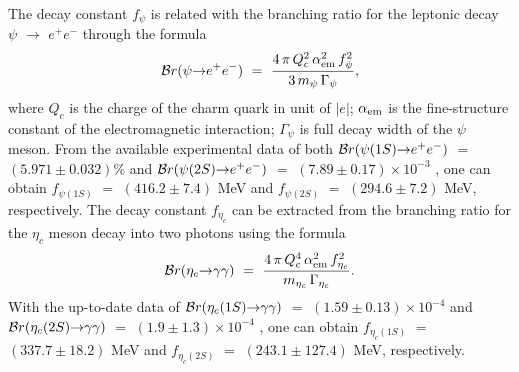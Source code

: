 \documentclass[preprint,superscriptaddress,nofootinbib]{revtex4}
\begin{document}
  The decay constant $f_{\psi}$ is related with the branching ratio
  for the leptonic decay ${\psi}$ ${\to}$ $e^{+}e^{-}$ through
  the formula \cite{prd74.034001}
   \begin{equation}
  {\cal B}r({\psi}{\to}e^{+}e^{-})\ =\
   \frac{ 4\,{\pi}\,Q_{c}^{2}\,{\alpha}_{\rm em}^{2}\,f_{\psi}^{2} }
        { 3\,m_{\psi}\,{\Gamma}_{\psi} }
   \label{fpsi},
   \end{equation}
  where $Q_{c}$ is the charge of the charm quark in unit of
  ${\vert}e{\vert}$; ${\alpha}_{\rm em}$ is the fine-structure
  constant of the electromagnetic interaction; ${\Gamma}_{\psi}$
  is full decay width of the ${\psi}$ meson.
  From the available experimental data of both
  ${\cal B}r({\psi}(1S){\to}e^{+}e^{-})$ $=$ $(5.971{\pm}0.032)\%$ and
  ${\cal B}r({\psi}(2S){\to}e^{+}e^{-})$ $=$ $(7.89{\pm}0.17){\times}10^{-3}$
  \cite{pdg}, one can obtain $f_{{\psi}(1S)}$ $=$ $(416.2{\pm}7.4)$
  MeV and $f_{{\psi}(2S)}$ $=$ $(294.6{\pm}7.2)$ MeV, respectively.
  The decay constant $f_{{\eta}_{c}}$ can be extracted from
  the branching ratio for the ${\eta}_{c}$ meson decay into two
  photons using the formula \cite{prd74.034001}
   \begin{equation}
  {\cal B}r({\eta}_{c}{\to}{\gamma}{\gamma})\ =\
   \frac{ 4\,{\pi}\,Q_{c}^{4}\,{\alpha}_{\rm em}^{2}\,f_{{\eta}_{c}}^{2} }
        { m_{{\eta}_{c}}\,{\Gamma}_{{\eta}_{c}} }
   \label{feta}.
   \end{equation}
  With the up-to-date data of
  ${\cal B}r({\eta}_{c}(1S){\to}{\gamma}{\gamma})$ $=$
  $(1.59{\pm}0.13){\times}10^{-4}$ and
  ${\cal B}r({\eta}_{c}(2S){\to}{\gamma}{\gamma})$ $=$
  $(1.9{\pm}1.3){\times}10^{-4}$ \cite{pdg}, one can obtain
  $f_{{\eta}_{c}(1S)}$ $=$ $(337.7{\pm}18.2)$
  MeV and $f_{{\eta}_{c}(2S)}$ $=$ $(243.1{\pm}127.4)$ MeV,
  respectively.
\end{document}
